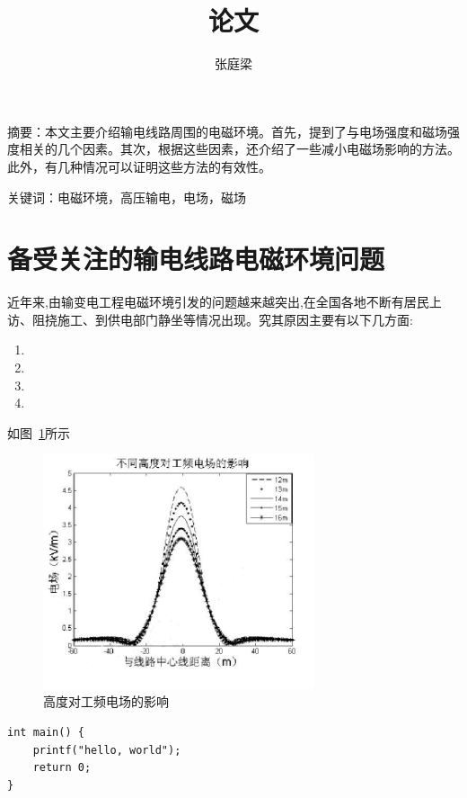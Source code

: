 \documentclass{ctexart} %
\title{论文}
\author{张庭梁}
\begin{document}
\maketitle

摘要：本文主要介绍输电线路周围的电磁环境。首先，提到了与电场强度和磁场强度相关的几个因素。其次，根据这些因素，还介绍了一些减小电磁场影响的方法。此外，有几种情况可以证明这些方法的有效性。

关键词：电磁环境，高压输电，电场，磁场


\section{备受关注的输电线路电磁环境问题}

近年来,由输变电工程电磁环境引发的问题越来越突出,在全国各地不断有居民上访、阻挠施工、到供电部门静坐等情况出现\cite{张可心2009超高压传输线电磁环境特性研究}。究其原因主要有以下几方面: 

\begin{enumerate}
\item 
\item 
\item
\item
\end{enumerate}

如图~\ref{1}所示
\begin{figure}[htbp]
\small
\centering
\includegraphics[width=8cm]{1.png}
\caption{高度对工频电场的影响} 
\label{1}
\end{figure}

\begin{verbatim}
int main() {
    printf("hello, world");
    return 0;
}
\end{verbatim}





\end{document}
